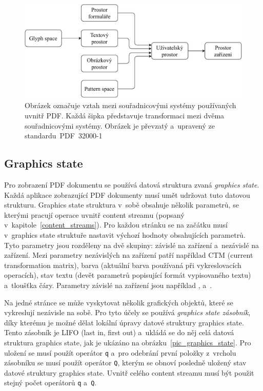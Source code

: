 \begin{figure}[H]
    \includegraphics[width=\linewidth]{obrazky-figures/coordinate_spaces.pdf}
    \caption[Vztah mezi souřadnicovými systémy používaných uvnitř PDF]{
        Obrázek označuje vztah mezi souřadnicovými systémy používaných uvnitř
        PDF. Každá šipka představuje transformaci mezi dvěma souřadnicovými 
        systémy. Obrázek je převzatý a~upravený ze 
        standardu~PDF~32000-1~\cite[k.~8.3.3, s.~117]{PDF32000-1:2008}
    }
    \label{coordinate_spaces}
\end{figure}


\subsection*{Graphics state} \label{graphics_state}
Pro zobrazení PDF dokumentu se používá datová struktura zvaná \emph{graphics state}.
Každá aplikace zobrazující PDF dokumenty musí umět udržovat tuto datovou strukturu.
Graphics state struktura v~sobě obsahuje několik parametrů, se kterými pracují
operace uvnitř content streamu (popsaný v~kapitole~\ref{content_streams}). Pro
každou stránku se na začátku musí v~graphics state struktuře nastavit výchozí
hodnoty obsahujících parametrů. Tyto parametry jsou rozděleny na dvě skupiny:
závislé na zařízení a~nezávislé na zařízení. Mezi parametry nezávislých na zařízení
patří například CTM (current transformation matrix), barva (aktuální barva
používaná při vykreslovacích operacích), stav textu (devět parametrů popisující
formát vypisovaného textu) a~tloušťka čáry. Parametry závislé na zařízení jsou
například ,  a~.

Na jedné stránce se může vyskytovat několik grafických objektů, které se
vykreslují nezávisle na sobě. Pro tyto účely se používá
\emph{graphics state zásobník}, díky kterému je možné dělat lokální úpravy 
datové struktury graphics state. Tento zásobník je LIFO (last in, first out)
a~ukládá se do něj celá datová struktura graphics state, jak je ukázáno na
obrázku~\ref{pic_graphics_state}. Pro uložení
se musí použít operátor \texttt{q} a~pro odebrání první položky z~vrcholu
zásobníku se musí použít operátor \texttt{Q}, kterým se obnoví posledně uložený
stav datové struktury graphics state. Uvnitř celého content streamu musí být
použit stejný počet operátorů \texttt{q} a~\texttt{Q}.

